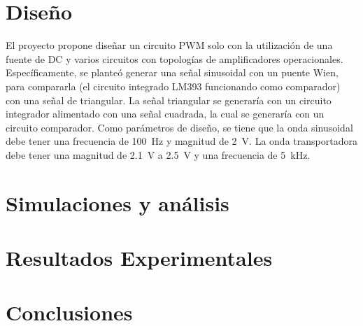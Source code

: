 \documentclass[journal, onecolumn]{IEEEtran}
\begin{document}
\section{Diseño}
El proyecto propone diseñar un circuito PWM solo con la utilización de una fuente de DC y varios circuitos con topologías de amplificadores operacionales. Específicamente, se planteó generar una señal sinusoidal con un puente Wien, para compararla (el circuito integrado LM393 funcionando como comparador) con una señal de triangular. La señal triangular se generaría con un circuito integrador alimentado con una señal cuadrada, la cual se generaría con un circuito comparador.
Como parámetros de diseño, se tiene que la onda sinusoidal debe tener una frecuencia de 100~Hz y magnitud de 2~V. La onda transportadora debe tener una magnitud de 2.1~V a 2.5~V y una frecuencia de 5~kHz.


\section{Simulaciones y análisis}




\section{Resultados Experimentales}





\section{Conclusiones}








\printbibliography

\vfill
\end{document}
